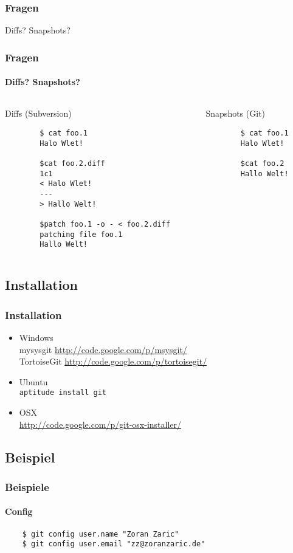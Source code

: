 \documentclass[]{beamer}
\begin{document}
\begin{frame}
	\frametitle{Fragen}
	\Huge{Diffs? Snapshots?}
\end{frame}

\begin{frame}[fragile]
	\frametitle{Fragen}
	\framesubtitle{Diffs? Snapshots?}
	\begin{columns}[T]
		\begin{column}{4.5cm}
		\huge{Diffs} \normalsize (Subversion)

		\begin{verbatim}
		$ cat foo.1
		Halo Wlet!

		$cat foo.2.diff
		1c1
		< Halo Wlet!
		---
		> Hallo Welt!

		$patch foo.1 -o - < foo.2.diff
		patching file foo.1
		Hallo Welt!
		\end{verbatim}
		\end{column}

		\begin{column}{4.5cm}
		\huge{Snapshots} \normalsize (Git)

		\begin{verbatim}
		$ cat foo.1
		Halo Wlet!

		$cat foo.2
		Hallo Welt!
		\end{verbatim}
		\end{column}
	\end{columns}
\end{frame}

\subsection{Installation}
\begin{frame}[fragile]
	\frametitle{Installation}
	\begin{itemize}
		\item
			Windows\\
			mysysgit \url{http://code.google.com/p/msysgit/}\\
			TortoiseGit \url{http://code.google.com/p/tortoisegit/}
		\item
			Ubuntu\\
			\verb|aptitude install git|
		\item
			OSX\\
			\url{http://code.google.com/p/git-osx-installer/}
	\end{itemize}
\end{frame}

\subsection{Beispiel}
\begin{frame}[fragile]
	\frametitle{Beispiele}
	\framesubtitle{Config}
	\begin{verbatim}
	$ git config user.name "Zoran Zaric"
	$ git config user.email "zz@zoranzaric.de"
	\end{verbatim}
\end{frame}
\end{document}
